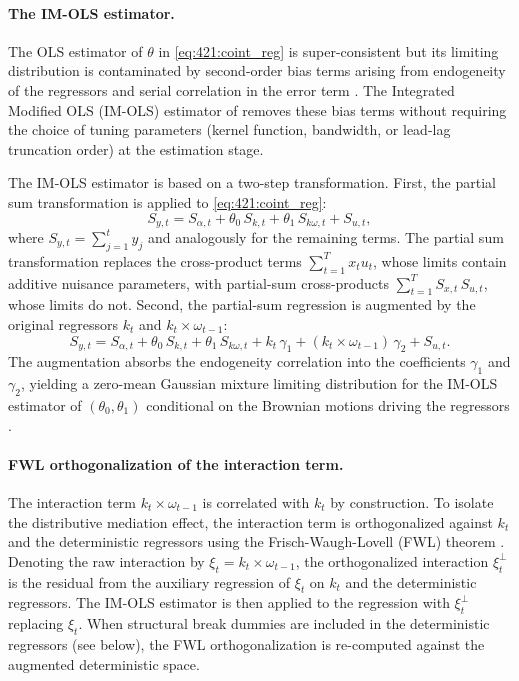 \paragraph{The IM-OLS estimator.}
The OLS estimator of $\theta$ in \eqref{eq:421:coint_reg} is
super-consistent but its limiting distribution is contaminated by
second-order bias terms arising from endogeneity of the regressors
and serial correlation in the error term
\citep{PhillipsHansen1990}. The Integrated Modified OLS (IM-OLS)
estimator of \citet{VogelsangWagner2014} removes these bias terms
without requiring the choice of tuning parameters (kernel function,
bandwidth, or lead-lag truncation order) at the estimation stage.

The IM-OLS estimator is based on a two-step transformation. First,
the partial sum transformation is applied to
\eqref{eq:421:coint_reg}:
\begin{equation}
	S_{y,t} = S_{\alpha,t} + \theta_0\, S_{k,t}
	+ \theta_1\, S_{k\omega,t} + S_{u,t},
	\label{eq:421:partial_sum}
\end{equation}
where $S_{y,t} = \sum_{j=1}^{t} y_j$ and analogously for the
remaining terms. The partial sum transformation replaces the
cross-product terms $\sum_{t=1}^{T} x_t u_t$, whose limits contain
additive nuisance parameters, with partial-sum cross-products
$\sum_{t=1}^{T} S_{x,t}\, S_{u,t}$, whose limits do not. Second,
the partial-sum regression is augmented by the original regressors
$k_t$ and $k_t \times \omega_{t-1}$:
\begin{equation}
	S_{y,t} = S_{\alpha,t} + \theta_0\, S_{k,t}
	+ \theta_1\, S_{k\omega,t}
	+ k_t\, \gamma_1
	+ (k_t \times \omega_{t-1})\, \gamma_2
	+ S_{u,t}.
	\label{eq:421:imols_augmented}
\end{equation}
The augmentation absorbs the endogeneity correlation into the
coefficients $\gamma_1$ and $\gamma_2$, yielding a zero-mean
Gaussian mixture limiting distribution for the IM-OLS estimator of
$(\theta_0, \theta_1)$ conditional on the Brownian motions driving
the regressors \citep[Theorem 2]{VogelsangWagner2014}.

\paragraph{FWL orthogonalization of the interaction term.}
The interaction term $k_t \times \omega_{t-1}$ is correlated with
$k_t$ by construction. To isolate the distributive mediation effect,
the interaction term is orthogonalized against $k_t$ and the
deterministic regressors using the Frisch-Waugh-Lovell (FWL)
theorem \citep{FrischWaugh1933,Lovell1963}. Denoting the raw interaction by
$\xi_t = k_t \times \omega_{t-1}$, the orthogonalized interaction
$\xi_t^{\perp}$ is the residual from the auxiliary regression of
$\xi_t$ on $k_t$ and the deterministic regressors. The IM-OLS
estimator is then applied to the regression with $\xi_t^{\perp}$
replacing $\xi_t$. When structural break dummies are included in
the deterministic regressors (see below), the FWL orthogonalization
is re-computed against the augmented deterministic space.

